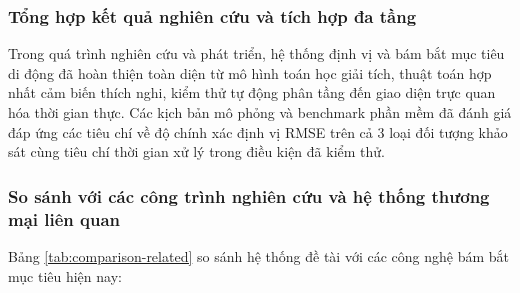 \begin{table}[H]
\centering
\caption{Thống kê định lượng tổng quan hệ thống bám bắt}
\label{tab:system-stats}
\end{table}

\subsubsection{Tổng hợp kết quả nghiên cứu và tích hợp đa tầng}

\hspace{0.5cm} Trong quá trình nghiên cứu và phát triển, hệ thống định vị và bám bắt mục tiêu di động đã hoàn thiện toàn diện từ mô hình toán học giải tích, thuật toán hợp nhất cảm biến thích nghi, kiểm thử tự động phân tầng đến giao diện trực quan hóa thời gian thực. Các kịch bản mô phỏng và benchmark phần mềm đã đánh giá đáp ứng các tiêu chí về độ chính xác định vị RMSE trên cả 3 loại đối tượng khảo sát cùng tiêu chí thời gian xử lý trong điều kiện đã kiểm thử.

\subsubsection{So sánh với các công trình nghiên cứu và hệ thống thương mại liên quan}

\hspace{0.5cm} Bảng \ref{tab:comparison-related} so sánh hệ thống đề tài với các công nghệ bám bắt mục tiêu hiện nay:

